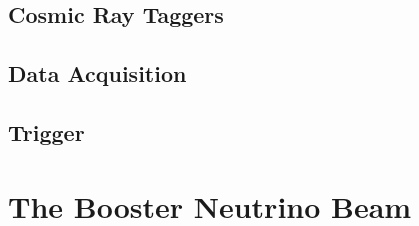 \subsection{Cosmic Ray Taggers}

\subsection{Data Acquisition}

\subsection{Trigger}


\section{The Booster Neutrino Beam}
